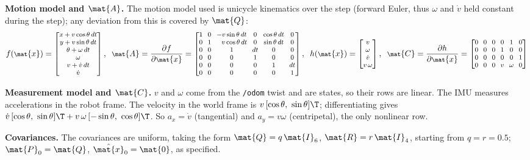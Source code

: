 \documentclass[11pt,twoside,letterpaper]{article}
\newcommand{\para}[1]{\textbf{#1}\quad}
\newcommand{\xh}{\hat{\mat{x}}}\newcommand{\xb}{\bar{\mat{x}}}\newcommand{\Pb}{\bar{\mat{P}}}
\begin{document}
\para{Motion model and $\mat{A}$.}
The motion model used is unicycle kinematics over the step (forward Euler, thus $\omega$ and $\dot v$ held constant during the step); any deviation from this is covered by $\mat{Q}$:
\begin{equation*}\footnotesize\setlength{\arraycolsep}{3.2pt}
f(\mat{x})=\begin{bmatrix} x+v\cos\theta\,dt\\ y+v\sin\theta\,dt\\ \theta+\omega\,dt\\ \omega\\ v+\dot v\,dt\\ \dot v\end{bmatrix},\;\;
\mat{A}=\frac{\partial f}{\partial \mat{x}}=\begin{bmatrix}
1&0&-v\sin\theta\,dt&0&\cos\theta\,dt&0\\
0&1&\phantom{-}v\cos\theta\,dt&0&\sin\theta\,dt&0\\
0&0&1&dt&0&0\\ 0&0&0&1&0&0\\ 0&0&0&0&1&dt\\ 0&0&0&0&0&1\end{bmatrix},\;\;
h(\mat{x})=\begin{bmatrix} v\\ \omega\\ \dot v\\ v\,\omega\end{bmatrix},\;\;
\mat{C}=\frac{\partial h}{\partial \mat{x}}=\begin{bmatrix}
0&0&0&0&1&0\\ 0&0&0&1&0&0\\ 0&0&0&0&0&1\\ 0&0&0&v&\omega&0\end{bmatrix}
\end{equation*}

\para{Measurement model and $\mat{C}$.}
$v$ and $\omega$ come from the \texttt{/odom} twist and are states, so their rows are linear.
The IMU measures accelerations in the robot frame.
The velocity in the world frame is $v\,[\cos\theta,\ \sin\theta]\T$; differentiating gives $\dot v\,[\cos\theta,\ \sin\theta]\T+v\,\omega\,[-\sin\theta,\ \cos\theta]\T$.
So $a_x=\dot v$ (tangential) and $a_y=v\omega$ (centripetal), the only nonlinear row.

\para{Covariances.}
The covariances are uniform, taking the form $\mat{Q}=q\,\mat{I}_6$, $\mat{R}=r\,\mat{I}_4$, starting from $q=r=0.5$; $\mat{P}_0=\mat{Q}$, $\xh_0=\mat{0}$, as specified. 
\end{document}
